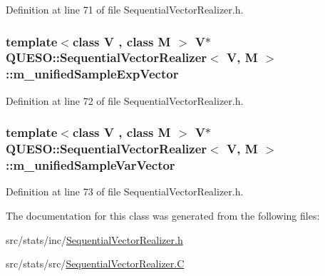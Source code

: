 Definition at line 71 of file Sequential\-Vector\-Realizer.\-h.

\hypertarget{class_q_u_e_s_o_1_1_sequential_vector_realizer_a9419977e751efa173663218427d5f4ce}{
\subsubsection[{m\-\_\-unified\-Sample\-Exp\-Vector}]{\setlength{\rightskip}{0pt plus 5cm}template$<$class V , class M $>$ V$\ast$ {\bf Q\-U\-E\-S\-O\-::\-Sequential\-Vector\-Realizer}$<$ V, M $>$\-::m\-\_\-unified\-Sample\-Exp\-Vector\hspace{0.3cm}{\ttfamily [private]}}}\label{class_q_u_e_s_o_1_1_sequential_vector_realizer_a9419977e751efa173663218427d5f4ce}


Definition at line 72 of file Sequential\-Vector\-Realizer.\-h.

\hypertarget{class_q_u_e_s_o_1_1_sequential_vector_realizer_a8c4b1311f473131c0ab55f02096b252b}{
\subsubsection[{m\-\_\-unified\-Sample\-Var\-Vector}]{\setlength{\rightskip}{0pt plus 5cm}template$<$class V , class M $>$ V$\ast$ {\bf Q\-U\-E\-S\-O\-::\-Sequential\-Vector\-Realizer}$<$ V, M $>$\-::m\-\_\-unified\-Sample\-Var\-Vector\hspace{0.3cm}{\ttfamily [private]}}}\label{class_q_u_e_s_o_1_1_sequential_vector_realizer_a8c4b1311f473131c0ab55f02096b252b}


Definition at line 73 of file Sequential\-Vector\-Realizer.\-h.



The documentation for this class was generated from the following files\-:\begin{DoxyCompactItemize}
\item 
src/stats/inc/\hyperlink{_sequential_vector_realizer_8h}{Sequential\-Vector\-Realizer.\-h}\item 
src/stats/src/\hyperlink{_sequential_vector_realizer_8_c}{Sequential\-Vector\-Realizer.\-C}\end{DoxyCompactItemize}
